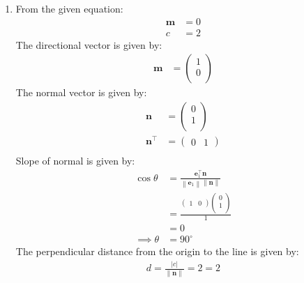 \documentclass[12pt]{article}
\providecommand{\norm}[1]{\left\lVert#1\right\rVert}
\newcommand{\myvec}[1]{\ensuremath{\begin{pmatrix}#1\end{pmatrix}}}
\let\vec\mathbf
\begin{document}
\begin{enumerate}
\item From the given equation:
         \begin{align}                                                                                                 \vec{m}&=0\\                                                                        			c&=2
         \end{align}                                                                                          The directional vector is given by:
          \begin{align}
                  \vec{m}&=\myvec{1\\0\\}
          \end{align}
          The normal vector is given by:
                  \begin{align}
         \vec{n}&=\myvec{0\\1\\}\\
          \vec{n}^\top&=\myvec{0 & 1}\\
                          \end{align}
          Slope of normal is given by:
		\begin{align}  
\cos\theta&=\frac{\vec{e}_{1}^\top\vec{n}}{\norm{\vec{e}_{1}}\norm{\vec{n}}}\\
			&=\frac{\myvec{1&0}\myvec{0 \\ 1\\}}{1}\\
			&=0\\
			\implies	\theta&=90^\circ             
                \end{align}      
 The perpendicular distance from the origin to the line is given by:    
                                      \begin{align}
			d=\frac{|c|}{\norm{\vec{n}}}=2                                                      =2
                  \end{align}
\\\\\\\\\\\\ 
\begin{figure}[!h]
\begin{center} 

\end{center}
\end{figure}
\end{enumerate}
\end{document}
